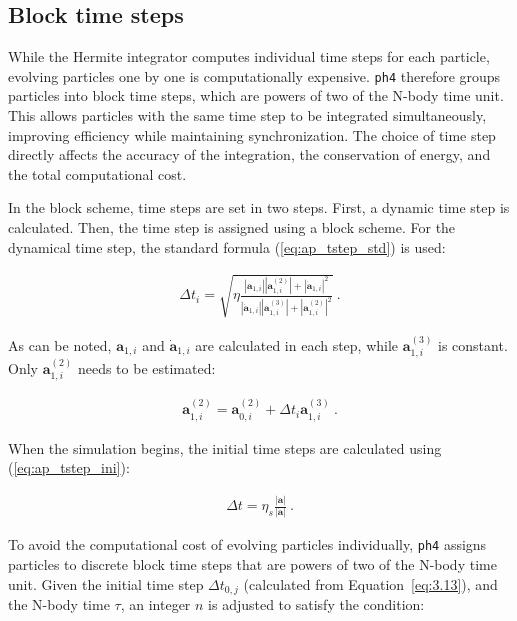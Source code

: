 \subsection{Block time steps}
\label{subsec:3.2.2_Block_Tstep}

While the Hermite integrator computes individual time steps for each particle, evolving particles one by one is computationally expensive. \texttt{ph4} therefore groups particles into block time steps, which are powers of two of the N-body time unit. This allows particles with the same time step to be integrated simultaneously, improving efficiency while maintaining synchronization. The choice of time step directly affects the accuracy of the integration, the conservation of energy, and the total computational cost.

In the block scheme, time steps are set in two steps. First, a dynamic time step is calculated. Then, the time step is assigned using a block scheme. For the dynamical time step, the standard formula (\ref{eq:ap_tstep_std}) is used:

\begin{align}
	\Delta t_i = \sqrt{\eta \frac{|\mathbf{a}_{1, i}| |\mathbf{a}^{(2)}_{1, i}| + |\dot{\mathbf{a}}_{1, i}|^2}{|\dot{\mathbf{a}}_{1, i}| |\mathbf{a}^{(3)}_{1, i}| + |\mathbf{a}^{(2)}_{1, i}|^2}} ~. \label{eq:3.11}
\end{align}

As can be noted, $\mathbf{a}_{1, i}$ and $\dot{\mathbf{a}}_{1, i}$ are calculated in each step, while $\mathbf{a}^{(3)}_{1, i}$ is constant. Only $\mathbf{a}^{(2)}_{1, i}$ needs to be estimated:

\begin{align}
	\mathbf{a}^{(2)}_{1, i} = \mathbf{a}^{(2)}_{0, i} + \Delta t_i \mathbf{a}^{(3)}_{1, i}~.
\end{align}

When the simulation begins, the initial time steps are calculated using (\ref{eq:ap_tstep_ini}):

\begin{align}
	\Delta t = \eta_s \frac{|\mathbf{a}|}{|\dot{\mathbf{a}}|}~. \label{eq:3.13}
\end{align}

To avoid the computational cost of evolving particles individually, \texttt{ph4} assigns particles to discrete block time steps that are powers of two of the N-body time unit. Given the initial time step $\Delta t_{0, j}$ (calculated from Equation~\eqref{eq:3.13}), and the N-body time $\tau$, an integer $n$ is adjusted to satisfy the condition:

